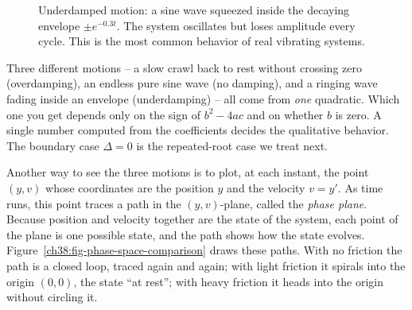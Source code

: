 \begin{figure}[htbp]
\centering
{}
\caption{Underdamped motion: a sine wave squeezed inside the decaying envelope
$\pm e^{-0.3t}$. The system oscillates but loses amplitude every cycle. This is
the most common behavior of real vibrating systems.}
\label{ch38:fig-underdamped}
\end{figure}

\begin{aestheticbox}
Three different motions -- a slow crawl back to rest without crossing zero
(overdamping), an endless pure sine wave (no damping), and a ringing wave fading
inside an envelope (underdamping) -- all come from \emph{one} quadratic. Which
one you get depends only on the sign of $b^2 - 4ac$ and on whether $b$ is zero.
A single number computed from the coefficients decides the qualitative behavior.
The boundary case $\Delta = 0$ is the repeated-root case we treat next.
\end{aestheticbox}

Another way to see the three motions is to plot, at each instant, the point
$(y, v)$ whose coordinates are the position $y$ and the velocity $v = y'$. As time
runs, this point traces a path in the $(y,v)$-plane, called the \emph{phase
plane}. Because position and velocity together are the state of the system, each
point of the plane is one possible state, and the path shows how the state
evolves. Figure~\ref{ch38:fig-phase-space-comparison} draws these paths. With no
friction the path is a closed loop, traced again and again; with light friction
it spirals into the origin $(0,0)$, the state ``at rest''; with heavy friction it
heads into the origin without circling it.

